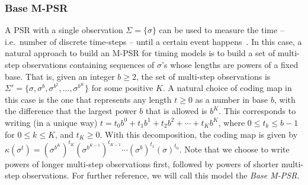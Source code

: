 \documentclass[letterpaper]{article}
\begin{document}
\subsubsection{Base M-PSR}
A PSR with a single observation $\Sigma = \{\sigma\}$ can be used to measure the time -- i.e.\ number of discrete time-steps -- until a certain event happens~\cite{ODM}. In this case, a natural approach to build an M-PSR for timing models is to build a set of multi-step observations containing sequences of $\sigma$'s whose lengths are powers of a fixed base. That is, given an integer $b \geq 2$, the set of multi-step observations is $\Sigma' = \{\sigma,\sigma^b, \sigma^{b^2}, \ldots, \sigma^{b^K}\}$ for some positive $K$. A natural choice of coding map in this case is the one that represents any length $t \geq 0$ as a number in base $b$, with the difference that the largest power $b$ that is allowed is $b^K$. This corresponds to writing (in a unique way) $t = t_0 b^0 + t_1 b^1 + t_2 b^2 + \cdots + t_K b^K$, where $0 \leq t_k \leq b - 1$ for $0 \leq k \leq K$, and $t_K \geq 0$. With this decomposition, the coding map is given by $\kappa(\sigma^t) = (\sigma^{b^K})^{t_K} (\sigma^{b^{K-1}})^{t_{K-1}} \cdots (\sigma^b)^{t_1} (\sigma)^{t_0}$. Note that we choose to write powers of longer multi-step observations first, followed by powers of shorter multi-step observations. For further reference, we will call this model the \emph{Base M-PSR}.
\end{document}
